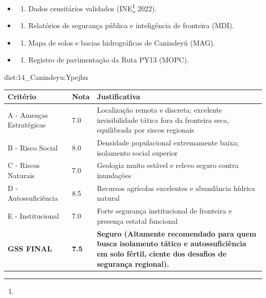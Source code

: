{\begin{itemize}
\tightlist
\item
  \begin{enumerate}
  \def\labelenumi{\arabic{enumi})}
  \tightlist
  \item
    Dados censitários validados (INE\footnote{\fineINE} 2022).
  \end{enumerate}
\item
  \begin{enumerate}
  \def\labelenumi{\arabic{enumi})}
  \setcounter{enumi}{1}
  \tightlist
  \item
    Relatórios de segurança pública e inteligência de fronteira (MDI).
  \end{enumerate}
\item
  \begin{enumerate}
  \def\labelenumi{\arabic{enumi})}
  \setcounter{enumi}{2}
  \tightlist
  \item
    Mapa de solos e bacias hidrográficas de Canindeyú (MAG).
  \end{enumerate}
\item
  \begin{enumerate}
  \def\labelenumi{\arabic{enumi})}
  \setcounter{enumi}{3}
  \tightlist
  \item
    Registro de pavimentação da Ruta PY13 (MOPC).
  \end{enumerate}
\end{itemize}}{dist:14_Canindeyu:Ypejhu}
\begin{table}[ht!]
\small \begin{tabular}{p{3.0cm}p{0.8cm}p{6.0cm}} \toprule
\textbf{Critério} & \textbf{Nota} & \textbf{Justificativa} \\ \midrule
A - Ameaças Estratégicas & 7.0 & Localização remota e discreta; excelente invisibilidade tática fora da fronteira seca, equilibrada por riscos regionais \\
B - Risco Social & 8.0 & Densidade populacional extremamente baixa; isolamento social superior \\
C - Riscos Naturais & 7.0 & Geologia muito estável e relevo seguro contra inundações \\
D - Autossuficiência & 8.5 & Recursos agrícolas excelentes e abundância hídrica natural \\
E - Institucional & 7.0 & Forte segurança institucional de fronteira e presença estatal funcional \\
\midrule \textbf{GSS FINAL} & \textbf{7.5} & \textbf{Seguro (Altamente recomendado para quem busca isolamento tático e autossuficiência em solo fértil, ciente dos desafios de segurança regional).} \\ \bottomrule \end{tabular}
\end{table}
